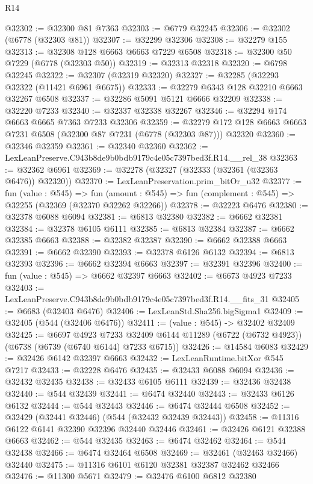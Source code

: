\begin{lexlean}{R14}
\begin{coremodule}
@32302 := @32300 @81 @7363
@32303 := @6779 @32245
@32306 := @32302 (@6778 (@32303 @81))
@32307 := @32299 @32306
@32308 := @32279 @155
@32313 := @32308 @128 @6663 @6663 @7229 @6508
@32318 := @32300 @50 @7229 (@6778 (@32303 @50))
@32319 := @32313 @32318
@32320 := @6798 @32245
@32322 := @32307 (@32319 @32320)
@32327 := @32285 (@32293 @32322 (@11421 @6961 @6675))
@32333 := @32279 @6343 @128 @32210 @6663 @32267 @6508
@32337 := @32286 @5091 @5121 @6666 @32209
@32338 := @32220 @7233
@32340 := @32337 @32338 @32267
@32346 := @32294 @174 @6663 @6665 @7363 @7233 @32306
@32359 := @32279 @172 @128 @6663 @6663 @7231 @6508 (@32300 @87 @7231 (@6778 (@32303 @87))) @32320
@32360 := @32346 @32359
@32361 := @32340 @32360
@32362 := LexLeanPreserve.C943b8de9b0bdb9179c4e05c7397bed3f.R14.__rel_38
@32363 := @32362 @6961
@32369 := @32278 (@32327 (@32333 (@32361 (@32363 @6476)) @32320))
@32370 := LexLeanPreservation.prim_bitOr_u32
@32377 := fun (value : @545) =>
  fun (amount : @545) => fun (complement : @545) => @32255 (@32369 (@32370 @32262 @32266))
@32378 := @32223 @6476
@32380 := @32378 @6088 @6094
@32381 := @6813 @32380
@32382 := @6662 @32381
@32384 := @32378 @6105 @6111
@32385 := @6813 @32384
@32387 := @6662 @32385 @6663
@32388 := @32382 @32387
@32390 := @6662 @32388 @6663
@32391 := @6662 @32390
@32393 := @32378 @6126 @6132
@32394 := @6813 @32393
@32396 := @6662 @32394 @6663
@32397 := @32391 @32396
@32400 := fun (value : @545) => @6662 @32397 @6663
@32402 := @6673 @4923 @7233
@32403 := LexLeanPreserve.C943b8de9b0bdb9179c4e05c7397bed3f.R14.__fits_31
@32405 := @6683 (@32403 @6476)
@32406 := LexLeanStd.Sha256.bigSigma1
@32409 := @32405 (@544 (@32406 @6476))
@32411 := (value : @545) -> @32402 @32409
@32425 := @6697
    @4923
    @7233
    @32409
    @6144
    @11289
    (@6722 (@6732 @4923))
    (@6738 (@6739 (@6740 @6144) @7233 @6715))
@32426 := @14584 @6083
@32429 := @32426 @6142 @32397 @6663
@32432 := LexLeanRuntime.bitXor @545 @7217
@32433 := @32228 @6476
@32435 := @32433 @6088 @6094
@32436 := @32432 @32435
@32438 := @32433 @6105 @6111
@32439 := @32436 @32438
@32440 := @544 @32439
@32441 := @6474 @32440
@32443 := @32433 @6126 @6132
@32444 := @544 @32443
@32446 := @6474 @32444 @6508
@32452 := @32429 (@32441 @32446) (@544 (@32432 @32439 @32443))
@32458 := @11316 @6122 @6141 @32390 @32396 @32440 @32446
@32461 := @32426 @6121 @32388 @6663
@32462 := @544 @32435
@32463 := @6474 @32462
@32464 := @544 @32438
@32466 := @6474 @32464 @6508
@32469 := @32461 (@32463 @32466) @32440
@32475 := @11316 @6101 @6120 @32381 @32387 @32462 @32466
@32476 := @11300 @5671
@32479 := @32476 @6100 @6812 @32380

\end{coremodule}
\end{lexlean}
